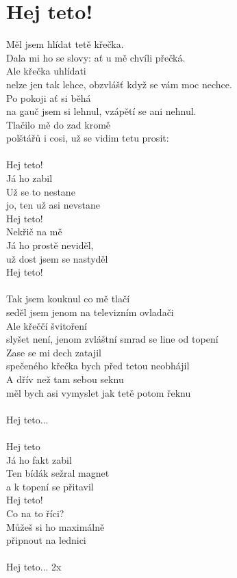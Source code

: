 \section{Hej teto!}
Měl jsem hlídat tetě křečka.\\
Dala mi ho se slovy: ať u mě chvíli přečká.\\
Ale křečka uhlídati\\
nelze jen tak lehce, obzvlášť když se vám moc nechce.\\
Po pokoji ať si běhá\\
na gauč jsem si lehnul, vzápětí se ani nehnul.\\
Tlačilo mě do zad kromě\\
polštářů i cosi, už se vidim tetu prosit:\\
\\
Hej teto!\\
Já ho zabil\\
Už se to nestane\\
jo, ten už asi nevstane\\
Hej teto!\\
Nekřič na mě\\
Já ho prostě neviděl,\\
už dost jsem se nastyděl\\
Hej teto!\\
\\
Tak jsem kouknul co mě tlačí\\
seděl jsem jenom na televizním ovladači\\
Ale křeččí švitoření\\
slyšet není, jenom zvláštní smrad se line od topení\\
Zase se mi dech zatajil\\
spečeného křečka bych před tetou neobhájil\\
A dřív než tam sebou seknu\\
měl bych asi vymyslet jak tetě potom řeknu\\
\\
Hej teto...\\
\\
Hej teto\\
Já ho fakt zabil\\
Ten bídák sežral magnet\\
a k topení se přitavil\\
Hej teto!\\
Co na to říci?\\
Můžeš si ho maximálně\\
připnout na lednici\\
\\
Hej teto... 2x